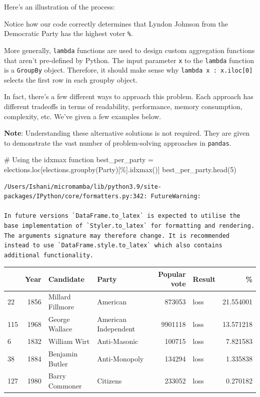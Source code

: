\documentclass[
  letterpaper,
  DIV=11,
  numbers=noendperiod]{scrreprt}
\newenvironment{Shaded}{\begin{snugshade}}{\end{snugshade}}
\newcommand{\CommentTok}[1]{\textcolor[rgb]{0.37,0.37,0.37}{#1}}
\newcommand{\DecValTok}[1]{\textcolor[rgb]{0.68,0.00,0.00}{#1}}
\newcommand{\NormalTok}[1]{\textcolor[rgb]{0.00,0.23,0.31}{#1}}
\newcommand{\OperatorTok}[1]{\textcolor[rgb]{0.37,0.37,0.37}{#1}}
\newcommand{\StringTok}[1]{\textcolor[rgb]{0.13,0.47,0.30}{#1}}
\begin{document}
Here's an illustration of the process:

Notice how our code correctly determines that Lyndon Johnson from the
Democratic Party has the highest voter \texttt{\%}.

More generally, \texttt{lambda} functions are used to design custom
aggregation functions that aren't pre-defined by Python. The input
parameter \texttt{x} to the \texttt{lambda} function is a
\texttt{GroupBy} object. Therefore, it should make sense why
\texttt{lambda\ x\ :\ x.iloc{[}0{]}} selects the first row in each
groupby object.

In fact, there's a few different ways to approach this problem. Each
approach has different tradeoffs in terms of readability, performance,
memory consumption, complexity, etc. We've given a few examples below.

\textbf{Note}: Understanding these alternative solutions is not
required. They are given to demonstrate the vast number of
problem-solving approaches in \texttt{pandas}.

\begin{Shaded}
\begin{Highlighting}[]
\CommentTok{\# Using the idxmax function}
\NormalTok{best\_per\_party }\OperatorTok{=}\NormalTok{ elections.loc[elections.groupby(}\StringTok{\textquotesingle{}Party\textquotesingle{}}\NormalTok{)[}\StringTok{\textquotesingle{}\%\textquotesingle{}}\NormalTok{].idxmax()]}
\NormalTok{best\_per\_party.head(}\DecValTok{5}\NormalTok{)}
\end{Highlighting}
\end{Shaded}

\begin{verbatim}
/Users/Ishani/micromamba/lib/python3.9/site-packages/IPython/core/formatters.py:342: FutureWarning:

In future versions `DataFrame.to_latex` is expected to utilise the base implementation of `Styler.to_latex` for formatting and rendering. The arguments signature may therefore change. It is recommended instead to use `DataFrame.style.to_latex` which also contains additional functionality.
\end{verbatim}

\begin{tabular}{lrllrlr}
\toprule
{} &  Year &         Candidate &                 Party &  Popular vote & Result &          \% \\
\midrule
22  &  1856 &  Millard Fillmore &              American &        873053 &   loss &  21.554001 \\
115 &  1968 &    George Wallace &  American Independent &       9901118 &   loss &  13.571218 \\
6   &  1832 &      William Wirt &          Anti-Masonic &        100715 &   loss &   7.821583 \\
38  &  1884 &   Benjamin Butler &         Anti-Monopoly &        134294 &   loss &   1.335838 \\
127 &  1980 &    Barry Commoner &              Citizens &        233052 &   loss &   0.270182 \\
\bottomrule
\end{tabular}
\end{document}
